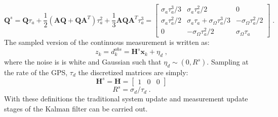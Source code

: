 \documentclass[paper=a4, fontsize=11pt]{scrartcl} %
\numberwithin{equation}{section} %
\numberwithin{figure}{section} %
\numberwithin{table}{section} %
\begin{document}
$$
\mathbf{Q}^s=\mathbf{Q}\tau_a+\frac{1}{2}(\mathbf{AQ}+\mathbf{QA}^T)\tau_a^2+\frac{1}{3}\mathbf{AQA}^T\tau^3_a=\left[\begin{matrix}
\sigma_a\tau_a^3/3 & \sigma_a\tau_a^2/2 & 0 \\
\sigma_a\tau_a^2/2 & \sigma_a\tau_a+\sigma_\Omega\tau_a^3/3 & -\sigma_\Omega\tau_a^2/2 \\
0 & -\sigma_\Omega\tau_a^2/2 & \sigma_\Omega\tau_a \end{matrix}\right]\;.
$$
The sampled version of the continuous measurement is written as:
$$
z_k=d^{obs}_k=\mathbf{H}^s\mathbf{x}_k+\eta_d\;,
$$
where the noise is is white and Gaussian such that $\eta_d\sim(0,R^s)$. Sampling at the rate of the GPS, $\tau_d$ the discretized matrices are simply:
$$
\mathbf{H}^s=\mathbf{H}=\left[\begin{matrix}
 1 & 0 & 0
\end{matrix}\right]
$$
$$
R^s=\sigma_d/\tau_d\;.
$$
With these definitions the traditional system update and measurement update stages of the Kalman filter can be carried out.
\end{document}
